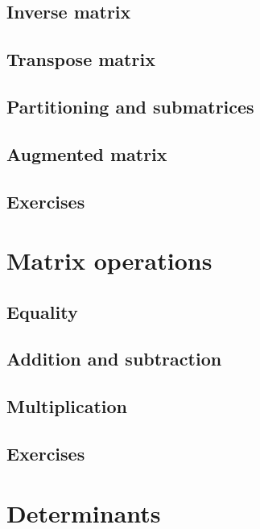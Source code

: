 \subsection{Inverse matrix}
\subsection{Transpose matrix}
\subsection{Partitioning and submatrices}
\subsection{Augmented matrix}
\subsection{Exercises}
\section{Matrix operations}
\subsection{Equality}
\subsection{Addition and subtraction}
\subsection{Multiplication}
\subsection{Exercises}
\section{Determinants}
